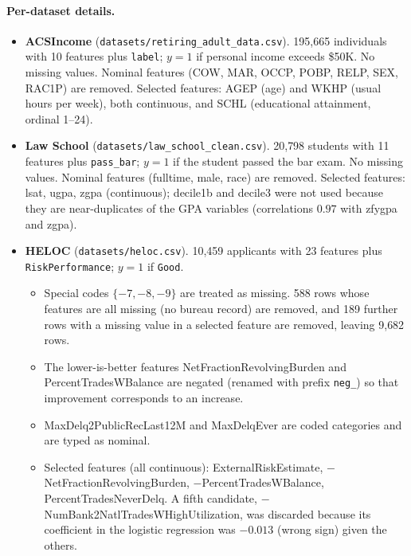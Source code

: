 \paragraph{Per-dataset details.}
\begin{itemize}
  \item \textbf{ACSIncome} \cite{ding2021retiring}
  (\texttt{datasets/retiring\_adult\_data.csv}).
  195{,}665 individuals with 10 features plus \texttt{label}; $y=1$ if personal
  income exceeds \$50K. No missing values. Nominal features
  (COW, MAR, OCCP, POBP, RELP, SEX, RAC1P) are removed. Selected features: AGEP
  (age) and WKHP (usual hours per week), both continuous, and SCHL (educational
  attainment, ordinal 1--24).
  \item \textbf{Law School} \cite{wightman1998lsac}
  (\texttt{datasets/law\_school\_clean.csv}).
  20{,}798 students with 11 features plus \texttt{pass\_bar}; $y=1$ if the
  student passed the bar exam. No missing values. Nominal features (fulltime,
  male, race) are removed. Selected features: lsat, ugpa, zgpa (continuous);
  decile1b and decile3 were not used because they are near-duplicates of the
  GPA variables (correlations $0.97$ with zfygpa and zgpa).
  \item \textbf{HELOC} \cite{fico2018heloc}
  (\texttt{datasets/heloc.csv}).
  10{,}459 applicants with 23 features plus \texttt{RiskPerformance}; $y=1$ if
  \texttt{Good}.
  \begin{itemize}
    \item Special codes $\{-7,-8,-9\}$ are treated as missing. 588 rows whose
          features are all missing (no bureau record) are removed, and 189 further
          rows with a missing value in a selected feature are removed, leaving
          9{,}682 rows.
    \item The lower-is-better features NetFractionRevolvingBurden and
          PercentTradesWBalance are negated (renamed with prefix \texttt{neg\_}) so
          that improvement corresponds to an increase.
    \item MaxDelq2PublicRecLast12M and MaxDelqEver are coded categories and are
          typed as nominal.
    \item Selected features (all continuous): ExternalRiskEstimate,
          $-$NetFractionRevolvingBurden, $-$PercentTradesWBalance,
          PercentTradesNeverDelq. A fifth candidate,
          $-$NumBank2NatlTradesWHighUtilization, was discarded because its
          coefficient in the logistic regression was $-0.013$ (wrong sign) given
          the others.

\end{itemize}
\end{itemize}
